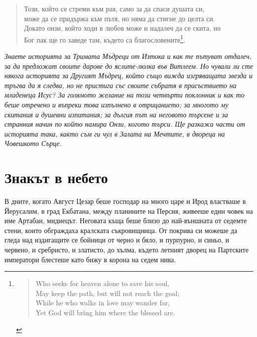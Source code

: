 \thispagestyle{plain}

\begin{quote}
  \fontsize{8}{10}\selectfont
  \begin{obeylines}
    \setlength{\parskip}{.1em}
    Този, който се стреми към рая, само за да спаси душата си,
    може да се придържа към пътя, но няма да стигне до целта си.
    Докато онзи, който ходи в любов може и надалеч да се скита, но
    Бог пак ще го заведе там, където са благословените\footnote{
    \vspace{-0.55cm}
    \begin{quote}
      \setlength{\leftskip}{-0.25cm}
      \begin{otherlanguage}{english}
        Who seeks for heaven alone to save his soul,
        May keep the path, but will not reach the goal;
        While he who walks in love may wander far,
        Yet God will bring him where the blessed are.
      \end{otherlanguage}
    \end{quote}
    }.
  \end{obeylines}
\end{quote}

\vspace{2cm}

\emph{Знаете историята за Тримата Мъдреци от Изтока и как те пътуват отдалеч, за
да предложат своите дарове до яслите-люлка във Витлеем. Но чували ли сте някога
историята за Другият Мъдрец, който също вижда изгряващата звезда и тръгва да я
следва, но не пристига със своите събратя в присъствието на младенеца Исус? За
голямото желание на този четвърти поклонник и как то беше отречено и въпреки
това изпълнено в отрицанието; за многото му скитания и душевни изпитания; за
дългия път на неговото търсене и за странния начин по който намира Онзи, когото
търси. Ще разкажа части от историята така, както съм ги чул в Залата на Мечтите,
в двореца на Човешкото Сърце.}

\newpage

\part{Знакът в небето}

В дните, когато Август Цезар беше господар на много царе и Ирод властваше в
Йерусалим, в град Екбатана, между планините на Персия, живееше един човек на име
Артабан, мидиецът. Неговата къща беше близо до най-външната от седемте стени,
които обграждаха кралската съкровищница. От покрива си можеше да гледа над
издигащите се бойници от черно и бяло, и пурпурно, и синьо, и червено, и
сребристо, и златисто, до хълма, където летният дворец на Партските императори
блестеше като бижу в корона на седем нива.

